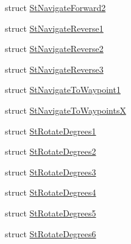 \begin{DoxyCompactItemize}
struct \hyperlink{structsm__dance__bot_1_1StNavigateForward2}{St\+Navigate\+Forward2}
\item 
struct \hyperlink{structsm__dance__bot_1_1StNavigateReverse1}{St\+Navigate\+Reverse1}
\item 
struct \hyperlink{structsm__dance__bot_1_1StNavigateReverse2}{St\+Navigate\+Reverse2}
\item 
struct \hyperlink{structsm__dance__bot_1_1StNavigateReverse3}{St\+Navigate\+Reverse3}
\item 
struct \hyperlink{structsm__dance__bot_1_1StNavigateToWaypoint1}{St\+Navigate\+To\+Waypoint1}
\item 
struct \hyperlink{structsm__dance__bot_1_1StNavigateToWaypointsX}{St\+Navigate\+To\+WaypointsX}
\item 
struct \hyperlink{structsm__dance__bot_1_1StRotateDegrees1}{St\+Rotate\+Degrees1}
\item 
struct \hyperlink{structsm__dance__bot_1_1StRotateDegrees2}{St\+Rotate\+Degrees2}
\item 
struct \hyperlink{structsm__dance__bot_1_1StRotateDegrees3}{St\+Rotate\+Degrees3}
\item 
struct \hyperlink{structsm__dance__bot_1_1StRotateDegrees4}{St\+Rotate\+Degrees4}
\item 
struct \hyperlink{structsm__dance__bot_1_1StRotateDegrees5}{St\+Rotate\+Degrees5}
\item 
struct \hyperlink{structsm__dance__bot_1_1StRotateDegrees6}{St\+Rotate\+Degrees6}
\end{DoxyCompactItemize}

